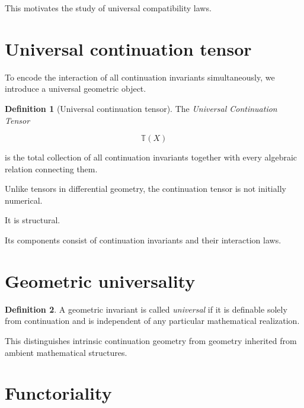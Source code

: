 \documentclass[13pt,openany]{book}
\theoremstyle{plain}
\theoremstyle{definition}
\newtheorem{definition}{Definition}[chapter]
\begin{document}
This motivates the study of universal compatibility laws.


\section{Universal continuation tensor}

To encode the interaction of all continuation invariants simultaneously, we introduce a universal geometric object.

\begin{definition}[Universal continuation tensor]

The \emph{Universal Continuation Tensor}

\[
\mathbb{T}(X)
\]

is the total collection of all continuation invariants together with every algebraic relation connecting them.

\end{definition}

Unlike tensors in differential geometry, the continuation tensor is not initially numerical.

It is structural.

Its components consist of continuation invariants and their interaction laws.


\section{Geometric universality}

\begin{definition}

A geometric invariant is called
\emph{universal}
if it is definable solely from continuation and is independent of any particular mathematical realization.

\end{definition}

This distinguishes intrinsic continuation geometry from geometry inherited from ambient mathematical structures.


\section{Functoriality}
\end{document}
